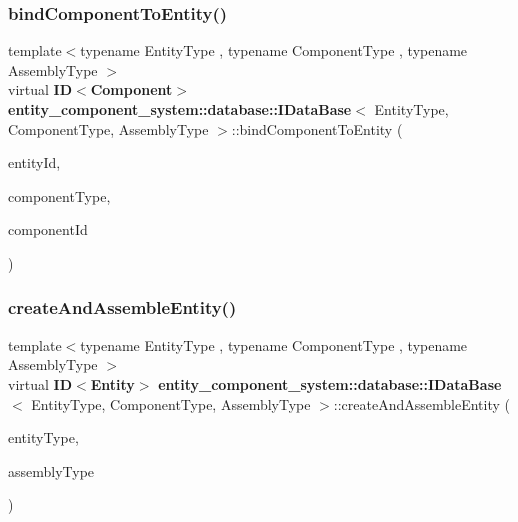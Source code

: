 \label{classentity__component__system_1_1database_1_1_i_data_base_a3fa3416dbb90294924923df7a67db356} 
\subsubsection{bind\+Component\+To\+Entity()}
{\footnotesize\ttfamily template$<$typename Entity\+Type , typename Component\+Type , typename Assembly\+Type $>$ \\
virtual {\bf ID}$<${\bf Component}$>$ {\bf entity\+\_\+component\+\_\+system\+::database\+::\+I\+Data\+Base}$<$ Entity\+Type, Component\+Type, Assembly\+Type $>$\+::bind\+Component\+To\+Entity (\begin{DoxyParamCaption}\item[{{\bf ID}$<$ {\bf Entity} $>$ const \&}]{entity\+Id,  }\item[{Component\+Type const}]{component\+Type,  }\item[{{\bf ID}$<$ {\bf Component} $>$ const \&}]{component\+Id }\end{DoxyParamCaption})\hspace{0.3cm}{\ttfamily [pure virtual]}}

\label{classentity__component__system_1_1database_1_1_i_data_base_a41c7ed5f04ac166e142878e32ae5e3e5} 
\subsubsection{create\+And\+Assemble\+Entity()}
{\footnotesize\ttfamily template$<$typename Entity\+Type , typename Component\+Type , typename Assembly\+Type $>$ \\
virtual {\bf ID}$<${\bf Entity}$>$ {\bf entity\+\_\+component\+\_\+system\+::database\+::\+I\+Data\+Base}$<$ Entity\+Type, Component\+Type, Assembly\+Type $>$\+::create\+And\+Assemble\+Entity (\begin{DoxyParamCaption}\item[{Entity\+Type const}]{entity\+Type,  }\item[{Assembly\+Type const}]{assembly\+Type }\end{DoxyParamCaption})\hspace{0.3cm}{\ttfamily [pure virtual]}}


